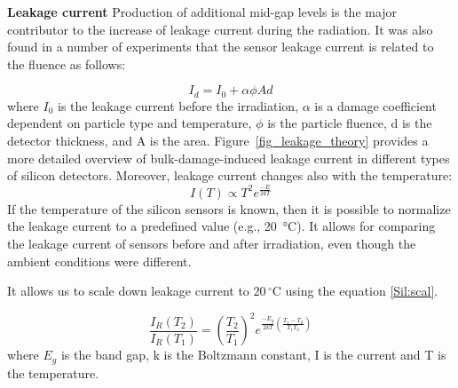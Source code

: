 \textbf{Leakage current}\bigbreak
Production of additional mid-gap levels is the major contributor to the increase of leakage current during the radiation. It was also found in a number of experiments that the sensor leakage current is related to the fluence as follows:

\begin{equation}
\label{eq:fluence}
    I_{d} = I_{0} + \alpha \phi Ad
\end{equation}
where $I_{0}$ is the leakage current before the irradiation, $\alpha$ is a damage coefficient dependent on particle type and temperature, $\phi$ is the particle fluence, d is the detector thickness, and A is the area. Figure~\ref{fig_leakage_theory} provides a more detailed overview of  bulk-damage-induced leakage current in different types of silicon detectors. Moreover, leakage current changes also with the temperature:
\begin{equation}
\label{Sil:temp}
    I(T) \propto T^{2}e^{\frac{-E}{2kT}}
\end{equation}
If the temperature of the silicon sensors is known, then it is possible to normalize the leakage current to a predefined value (e.g., \SI{20}{\celsius}). It allows for comparing the leakage current of sensors before and after irradiation, even though the ambient conditions were different. 

It allows us to scale down leakage current to $20\,^{\circ}$C using the equation \ref{Sil:scal}.
 
\begin{equation}
\label{Sil:scal}
    \frac{I_{R}(T_{2})}{I_{R}(T_{1})} = (\frac{T_{2}}{T_{1}})^{2}e^{\frac{-E_{g}}{2kT}(\frac{T_{1}-T_{2}}{T_{1}T_{2}})}
\end{equation}
where $E_{g}$ is the band gap, k is the Boltzmann constant, I is the current and T is the temperature.


